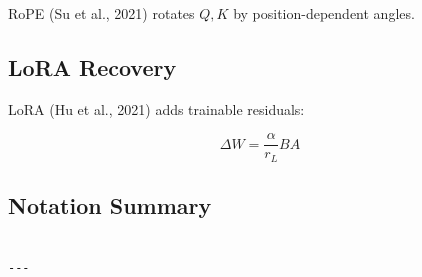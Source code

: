 RoPE (Su et al., 2021) rotates $Q, K$ by position-dependent angles.

\subsection{LoRA Recovery}

LoRA (Hu et al., 2021) adds trainable residuals:

\[
\Delta W = \frac{\alpha}{r_L} B A
\tag{3.10}
\]

\subsection{Notation Summary}

\begin{lstlisting}

---
\end{lstlisting}
